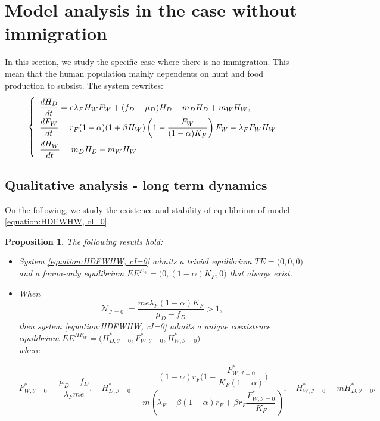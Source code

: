 \documentclass{article}
\newcommand{\lfw}{\lambda_{F}}
\newcommand{\lfw}{\lambda_{F}}
\newcommand{\cI}{\mathcal{I}}
\newtheorem{prop}{Proposition}
\begin{document}
\section{Model analysis in the case without immigration}
In this section, we study the specific case where there is no immigration. This mean that the human population mainly dependents on hunt and food production to subsist. The system rewrites:
\begin{equation}
\def\arraystretch{2}
\left\{ \begin{array}{l}
\dfrac{dH_D}{dt}= e\lfw H_W F_W + (f_D - \mu_D) H_D - m_D H_D + m_W H_W, \\
\dfrac{dF_W}{dt} = r_F(1- \alpha) (1+ \beta H_W) \left(1 - \dfrac{F_W}{(1-\alpha)K_F} \right) F_W - \lfw F_W H_W \\
\dfrac{dH_W}{dt}= m_D H_D - m_W H_W 
\end{array} \right.
\label{equation:HDFWHW, cI=0}
\end{equation}


\subsection{Qualitative analysis - long term dynamics}
On the following, we study the existence and stability of equilibrium of model \eqref{equation:HDFWHW, cI=0}. 


\begin{prop}
\label{theoremEquilibre, cI=0}
The following results hold:
\begin{itemize}
\item System \eqref{equation:HDFWHW, cI=0} admits a trivial equilibrium $TE = \Big(0,0,0\Big)$ and a fauna-only equilibrium $EE^{F_W} = \Big(0, (1-\alpha)K_F, 0 \Big)$ that always exist.

\item When
$$
\mathcal{N}_{\cI = 0} := \dfrac{m e \lfw (1-\alpha)K_F}{\mu_D - f_D} >1,
$$ 
then system \eqref{equation:HDFWHW, cI=0} admits a unique coexistence equilibrium $EE^{HF_W} = \Big(H^*_{D, \cI = 0}, F^*_{W, \cI = 0}, H^*_{W, \cI = 0} \Big)$ \\ 
where 


$$F^*_{W, \cI = 0} = \dfrac{\mu_D - f_D}{\lfw m e},
\quad 
H^*_{D, \cI = 0} = \dfrac{(1-\alpha)r_F\Big(1 - \dfrac{F^*_{W, \cI = 0}}{K_F(1-\alpha)} \Big)}{m\left(\lfw - \beta (1-\alpha) r_F + \beta r_F  \dfrac{F^*_{W, \cI = 0}}{K_F}\right)} ,
\quad 
H^*_{W, \cI = 0} = m H^*_{D, \cI = 0}.$$
\end{itemize}
\end{prop}
\end{document}
